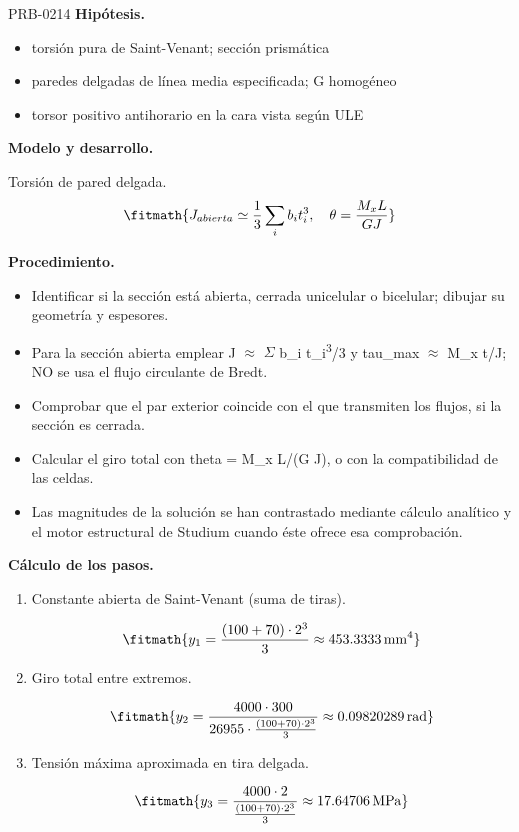 \begin{studiumworked}{PRB-0214}
\textbf{Hipótesis.}\begin{itemize}\item torsión pura de Saint-Venant; sección prismática
\item paredes delgadas de línea media especificada; G homogéneo
\item torsor positivo antihorario en la cara vista según ULE\end{itemize}

\textbf{Modelo y desarrollo.}

Torsión de pared delgada.\[\fitmath{J_{abierta}\simeq\frac13\sum_i b_i t_i^3,\quad \theta=\frac{M_xL}{GJ}}\]

\textbf{Procedimiento.}\begin{itemize}\item Identificar si la sección está abierta, cerrada unicelular o bicelular; dibujar su geometría y espesores.
\item Para la sección abierta emplear J \ensuremath{\approx} \ensuremath{\Sigma} b\_i t\_i\textsuperscript{3}/3 y tau\_max \ensuremath{\approx} M\_x t/J; NO se usa el flujo circulante de Bredt.
\item Comprobar que el par exterior coincide con el que transmiten los flujos, si la sección es cerrada.
\item Calcular el giro total con theta = M\_x L/(G J), o con la compatibilidad de las celdas.
\item Las magnitudes de la solución se han contrastado mediante cálculo analítico y el motor estructural de Studium cuando éste ofrece esa comprobación.\end{itemize}

\textbf{Cálculo de los pasos.}

\begin{enumerate}

\item Constante abierta de Saint-Venant (suma de tiras).

\[\fitmath{y_{1}=\frac{\left(100+70\right)\cdot {2}^{3}}{3}\approx 453.3333\,\mathrm{mm^{4}}}\]

\item Giro total entre extremos.

\[\fitmath{y_{2}=\frac{4000\cdot 300}{26955\cdot \frac{\left(100+70\right)\cdot {2}^{3}}{3}}\approx 0.09820289\,\mathrm{rad}}\]

\item Tensión máxima aproximada en tira delgada.

\[\fitmath{y_{3}=\frac{4000\cdot 2}{\frac{\left(100+70\right)\cdot {2}^{3}}{3}}\approx 17.64706\,\mathrm{MPa}}\]


\end{enumerate}
\end{studiumworked}
